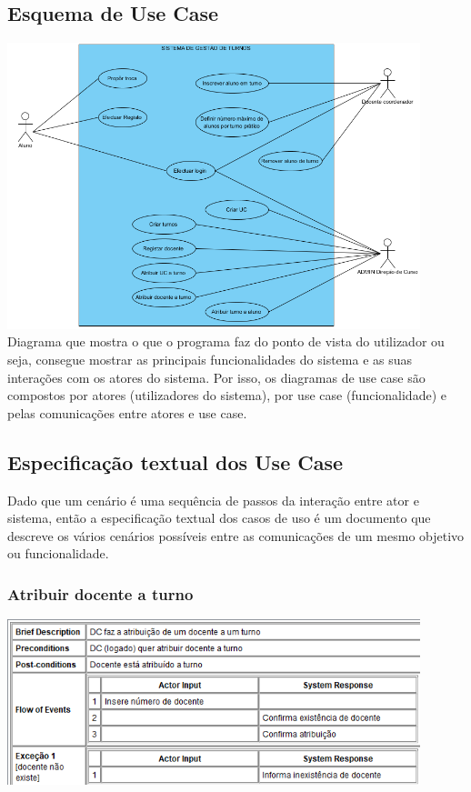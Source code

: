 \documentclass[a4paper]{article}
\begin{document}
\subsection{Esquema de Use Case}

\includegraphics[width=12cm]{diagramausecase}\break
Diagrama que mostra o que o programa faz do ponto de vista do utilizador ou seja, consegue mostrar as principais funcionalidades do sistema e as suas interações com os atores do sistema. Por isso, os diagramas de use case são compostos por atores (utilizadores do sistema), por use case (funcionalidade) e pelas comunicações entre atores e use case.

\subsection{Especificação textual dos Use Case}
Dado que um cenário é uma sequência de passos da interação entre ator e sistema, então a especificação textual dos casos de uso é um documento que descreve os vários cenários possíveis entre as comunicações de um mesmo objetivo ou funcionalidade.

\subsubsection{Atribuir docente a turno}
\includegraphics[width=12cm]{atribuidocenteturno}\break
\end{document}
